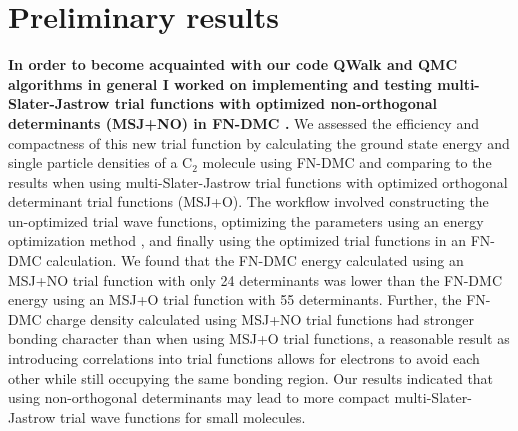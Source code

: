 \documentclass{article}
\begin{document}
\section{Preliminary results}
\textbf{In order to become acquainted with our code QWalk \cite{WAGNER20093390} and QMC algorithms in general I worked on implementing and testing multi-Slater-Jastrow trial functions with optimized non-orthogonal determinants (MSJ+NO) in FN-DMC \cite{Pathak2018}.}
We assessed the efficiency and compactness of this new trial function by calculating the ground state energy and single particle densities of a C$_2$ molecule using FN-DMC and comparing to the results when using multi-Slater-Jastrow trial functions with optimized orthogonal determinant trial functions (MSJ+O). 
The workflow involved constructing the un-optimized trial wave functions, optimizing the parameters using an energy optimization method \cite{Toulouse2007}, and finally using the optimized trial functions in an FN-DMC calculation. 
We found that the FN-DMC energy calculated using an MSJ+NO trial function with only 24 determinants was lower than the FN-DMC energy using an MSJ+O trial function with 55 determinants. 
Further, the FN-DMC charge density calculated using MSJ+NO trial functions had stronger bonding character than when using MSJ+O trial functions, a reasonable result as introducing correlations into trial functions allows for electrons to avoid each other while still occupying the same bonding region. 
Our results indicated that using non-orthogonal determinants may lead to more compact multi-Slater-Jastrow trial wave functions for small molecules.
\end{document}
